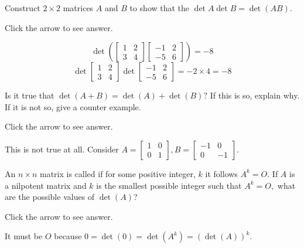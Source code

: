 \documentclass{ximera}
\begin{document}
\begin{problem}\label{prb:7.16} Construct $2\times 2$ matrices $A$ and $B$ to show that the
$\det A \det B = \det (AB)$.

Click the arrow to see answer.
\begin{expandable}
\[
\det
\left( \left[
\begin{array}{cc}
1 & 2 \\
3 & 4
\end{array}
\right] \left[
\begin{array}{rr}
-1 & 2 \\
-5 & 6
\end{array}
\right] \right) = -8
\]
\[
\det \left[
\begin{array}{cc}
1 & 2 \\
3 & 4
\end{array}
\right] \det \left[
\begin{array}{rr}
-1 & 2 \\
-5 & 6
\end{array}
\right] = -2 \times 4 = -8
\]
\end{expandable}
\end{problem}

\begin{problem}\label{prb:7.17} Is it true that $\det \left( A+B\right) =\det \left( A\right) +\det
\left( B\right) ?$ If this is so, explain why. If it is not so,
give a counter example.

Click the arrow to see answer.
\begin{expandable}
This is not true at all. Consider $A=\left[
\begin{array}{cc}
1 & 0 \\
0 & 1
\end{array}
\right] ,B=\left[
\begin{array}{rr}
-1 & 0 \\
0 & -1
\end{array}
\right] .$
\end{expandable}
\end{problem}

\begin{problem}\label{prb:7.18} An $n\times n$ matrix is called 
if for some positive integer, $k$ it follows $A^{k}=O.$ If
$A$ is a nilpotent matrix and $k$ is the smallest possible integer such that
$A^{k}=O,$ what are the possible values of $\det \left( A\right)$?

Click the arrow to see answer.
\begin{expandable}
It must
be $O$ because $0=\det \left( 0\right) =\det \left( A^{k}\right) =\left( \det
\left( A\right) \right) ^{k}.$
\end{expandable}
\end{problem}
\end{document}
